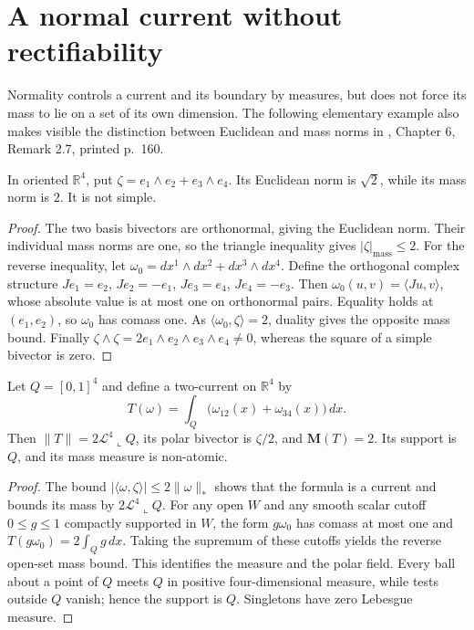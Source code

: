 \chapter{A normal current without rectifiability}\label{sec:examples-diffuse-current}
Normality controls a current and its boundary by measures, but does not force its mass to lie on a set of its own dimension. The following elementary example also makes visible the distinction between Euclidean and mass norms in \cite{Sim18}, Chapter 6, Remark 2.7, printed p.~160.

\begin{example}\label{ex:nonsimple-bivector-mass}
In oriented $\mathbb R^4$, put $\zeta=e_1\wedge e_2+e_3\wedge e_4$. Its Euclidean norm is $\sqrt2$, while its mass norm is $2$. It is not simple.
\end{example}
\begin{proof}
The two basis bivectors are orthonormal, giving the Euclidean norm. Their individual mass norms are one, so the triangle inequality gives $|\zeta|_{\mathrm{mass}}\leq2$. For the reverse inequality, let $\omega_0=dx^1\wedge dx^2+dx^3\wedge dx^4$. Define the orthogonal complex structure $Je_1=e_2$, $Je_2=-e_1$, $Je_3=e_4$, $Je_4=-e_3$. Then $\omega_0(u,v)=\langle Ju,v\rangle$, whose absolute value is at most one on orthonormal pairs. Equality holds at $(e_1,e_2)$, so $\omega_0$ has comass one. As $\langle\omega_0,\zeta\rangle=2$, duality gives the opposite mass bound. Finally $\zeta\wedge\zeta=2e_1\wedge e_2\wedge e_3\wedge e_4\ne0$, whereas the square of a simple bivector is zero.
\end{proof}

\begin{example}\label{ex:diffuse-two-current}
Let $Q=[0,1]^4$ and define a two-current on $\mathbb R^4$ by
\[
 T(\omega)=\int_Q\bigl(\omega_{12}(x)+\omega_{34}(x)\bigr)\,dx.
\]
Then $\|T\|=2\mathcal L^4\llcorner Q$, its polar bivector is $\zeta/2$, and $\mathbf M(T)=2$. Its support is $Q$, and its mass measure is non-atomic.
\end{example}
\begin{proof}
The bound $|\langle\omega,\zeta\rangle|\leq2\|\omega\|_*$ shows that the formula is a current and bounds its mass by $2\mathcal L^4\llcorner Q$. For any open $W$ and any smooth scalar cutoff $0\leq g\leq1$ compactly supported in $W$, the form $g\omega_0$ has comass at most one and $T(g\omega_0)=2\int_Qg\,dx$. Taking the supremum of these cutoffs yields the reverse open-set mass bound. This identifies the measure and the polar field. Every ball about a point of $Q$ meets $Q$ in positive four-dimensional measure, while tests outside $Q$ vanish; hence the support is $Q$. Singletons have zero Lebesgue measure.
\end{proof}

